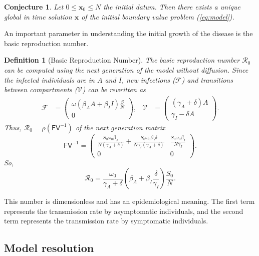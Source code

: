 \documentclass[11pt]{article}
\newcommand{\Ro}{\mathcal{R}_0}
\renewcommand\vec{\mathbf}
\newcommand{\mat}[1]{\mathsf{#1}}
\newtheorem{conjecture}{Conjecture}
\newtheorem{definition}{Definition}
\begin{document}
		\begin{conjecture}
			Let $0 \leq \vec{x}_0 \leq N$ the initial datum.
			Then there exists a unique global in time solution $\vec{x}$ of the initial boundary value problem (\ref{eq:model}).
		\end{conjecture}
		
		An important parameter in understanding the initial growth of the disease is the basic reproduction number.
		\begin{definition}[Basic Reproduction Number]
			The basic reproduction number $\Ro$ can be computed using the next generation of the model without diffusion.
			Since the infected individuals are in $A$ and $I$, new infections ($\mathcal{F}$) and transitions between compartments ($\mathcal{V}$) can be rewritten as
			\begin{align*}
				\mathcal{F} &= \begin{pmatrix} \omega (\beta_A A + \beta_I I) \frac{S}{N} \\ 0 \end{pmatrix}, &
				\mathcal{V} &= \begin{pmatrix} (\gamma_A + \delta) A \\ \gamma_I - \delta A \end{pmatrix}.
			\end{align*}
			Thus, $\Ro = \rho (\mat{F} \mat{V}^{-1})$ of the next generation matrix
			\begin{equation*}
				\mat{F} \mat{V}^{-1} = \begin{pmatrix} 
				\frac{S_0 \omega_0 \beta_A}{N (\gamma_A + \delta)} + \frac{S_0 \omega_0 \beta_I \delta}{N \gamma_I (\gamma_A + \delta)} & 
				\frac{S_0 \omega_0 \beta_I}{N \gamma_I} \\ 
				0 & 0 \end{pmatrix}.
			\end{equation*}
			So,
			\begin{equation} \label{eq:ro}
				\Ro =  \frac{\omega_0}{\gamma_A + \delta}  \left( \beta_A + \beta_I \frac{\delta}{\gamma_I} \right) \frac{S_0}{N}.
			\end{equation}
		\end{definition}
		This number is dimensionless and has an epidemiological meaning.
		The first term represents the transmission rate by asymptomatic individuals, and the second term represents the transmission rate by symptomatic individuals.
			
	\subsection{Model resolution}
	
\end{document}
